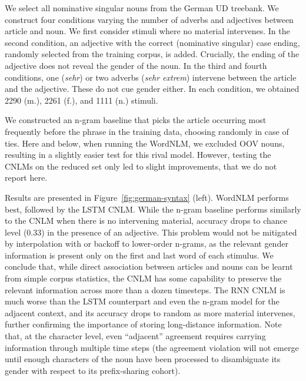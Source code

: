 We select all nominative singular nouns from the German UD treebank. %
We construct four conditions varying the number of adverbs and adjectives between  article and noun.
We first consider stimuli where no material intervenes. %
In the second condition, an adjective with the correct (nominative singular) case ending, randomly selected from the training corpus, is added. Crucially, the ending of the adjective does not reveal the gender of the noun.
In the third and fourth conditions, one (\emph{sehr}) or two adverbs (\emph{sehr extrem}) intervene between the article and the adjective. These do not cue gender either. In each condition, we obtained 2290 (m.), 2261 (f.), and 1111 (n.) stimuli.

We constructed an n-gram baseline that picks the article occurring
most frequently before the phrase in the training data, choosing
randomly in case of ties. Here and below, when running the
WordNLM, we excluded OOV nouns, resulting in a slightly easier test
for this rival model. However, testing the CNLMs on the reduced set
only led to slight improvements, that we do not report here.

Results are presented in Figure~\ref{fig:german-syntax}
(left). WordNLM performs best, followed by the LSTM CNLM.  While the
n-gram baseline performs similarly to the CNLM when there is no
intervening material, accuracy drops to chance level (0.33) in the
presence of an adjective. This problem would not be mitigated by
interpolation with or backoff to lower-order n-grams, as the relevant
gender information is present only on the first and last word of each
stimulus. We conclude that, while direct association between articles
and nouns can be learnt from simple corpus statistics, the CNLM has
some capability to preserve the relevant information across more than
a dozen timesteps. The RNN CNLM is much worse than the LSTM
counterpart and even the n-gram model for the adjacent context, and
its accuracy drops to random as more material intervenes, further
confirming the importance of storing long-distance information. Note
that, at the character level, even ``adjacent'' agreement requires
carrying information through multiple time steps (the agreement
violation will not emerge until enough characters of the noun have
been processed to disambiguate its gender with respect to its
prefix-sharing cohort).

